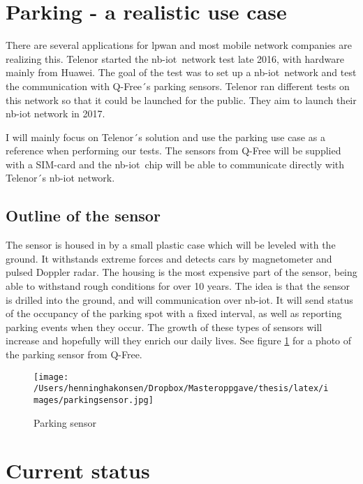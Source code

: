 \documentclass[USenglish]{ifimaster}  %
\begin{document}
\section{Parking - a realistic use case} %
There are several applications for \acrshort{lpwan} and most mobile network companies are realizing this. Telenor started the \acrshort{nb-iot} network test late 2016, with hardware mainly from Huawei. The goal of the test was to set up a \acrshort{nb-iot} network and test the communication with Q-Free´s parking sensors. Telenor ran different tests on this network so that it could be launched for the public. They aim to launch their \acrshort{nb-iot} network in 2017.

I will mainly focus on Telenor´s solution and use the parking use case as a reference when performing our tests. The sensors from Q-Free will be supplied with a SIM-card and the \acrshort{nb-iot} chip will be able to communicate directly with Telenor´s \acrshort{nb-iot} network.

\subsection{Outline of the sensor} \label{ssection:sensoroutline}
The sensor is housed in by a small plastic case which will be leveled with the ground. It withstands extreme forces and detects cars by magnetometer and pulsed Doppler radar. The housing is the most expensive part of the sensor, being able to withstand rough conditions for over 10 years. The idea is that the sensor is drilled into the ground, and will communication over \acrshort{nb-iot}. It will send status of the occupancy of the parking spot with a fixed interval, as well as reporting parking events when they occur. The growth of these types of sensors will increase and hopefully will they enrich our daily lives. See figure \ref{pic:parkingsensor} for a photo of the parking sensor from Q-Free.

\begin{figure}[ht]
  \centering\texttt{[image: /Users/henninghakonsen/Dropbox/Masteroppgave/thesis/latex/images/parkingsensor.jpg]}
  \caption{Parking sensor  \cite{person:ola}}
  \label{pic:parkingsensor}
\end{figure}

\section{Current status}
\end{document}
